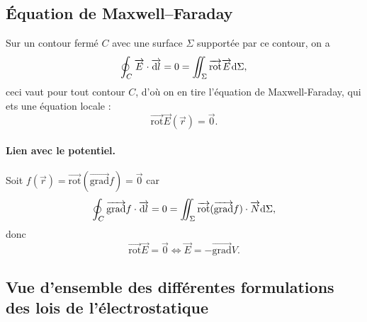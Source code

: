     \subsection{Équation de Maxwell--Faraday}

        Sur un contour fermé $C$ avec une surface $\Sigma$ supportée par ce contour, on a 
        \begin{equation*}
            \oint_{C}\protect\overrightarrow{{E}}\cdot\protect\overrightarrow{{\mathrm{d} l}}=0=\iint_{\Sigma}\protect\overrightarrow{{\mathrm{rot}}}\protect\overrightarrow{{E}}\mathrm{d}\Sigma,
        \end{equation*}
        ceci vaut pour tout contour $C$, d'où on en tire l'équation de Maxwell-Faraday, qui ets une équation locale :
        \begin{equation*}
            \boxed{
                \vec{\mathrm{rot}}\vec{E}(\vec{r})=\vec{0}.
            }
        \end{equation*}

        \paragraph{Lien avec le potentiel.}

            Soit $f(\vec{r})=\vec{\mathrm{rot}}(\vec{\mathrm{grad}}f)=\vec{0}$ car
            \begin{equation*}
                \oint_{C}\protect\overrightarrow{{\mathrm{grad}}}f\cdot\protect\overrightarrow{{\mathrm{d} l}}=0=\iint_{\Sigma}\protect\overrightarrow{{\mathrm{rot}}}(\protect\overrightarrow{{\mathrm{grad}}}f)\cdot\protect\overrightarrow{{N}}\mathrm{d}\Sigma,
            \end{equation*}
            donc
            \begin{equation*}
                \boxed{
                    \vec{\mathrm{rot}}\vec{E}=\vec{0}\Longleftrightarrow\vec{E}=-\vec{\mathrm{grad}}V.
                }
            \end{equation*}

    \subsection{Vue d'ensemble des différentes formulations des lois de l'électrostatique}

